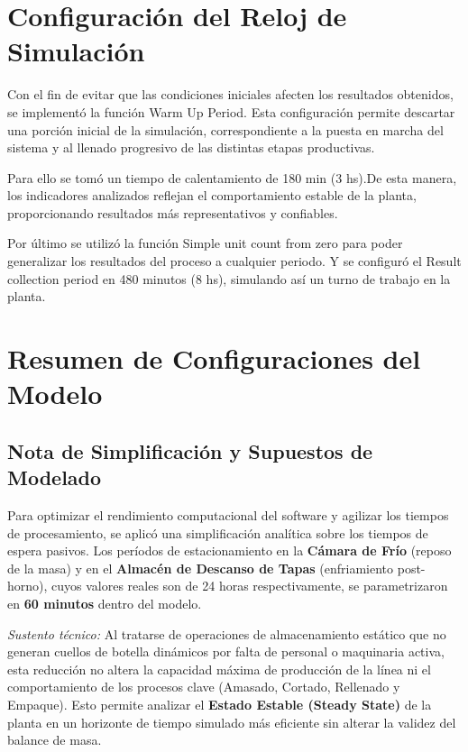 \documentclass[runningheads]{llncs}
\begin{document}
\section{Configuración del Reloj de Simulación}

Con el fin de evitar que las condiciones iniciales afecten los resultados obtenidos, se implementó la función Warm Up Period. Esta configuración permite descartar una porción inicial de la simulación, correspondiente a la puesta en marcha del sistema y al llenado progresivo de las distintas etapas productivas.

Para ello se tomó un tiempo de calentamiento de 180 min (3 hs).De esta manera, los indicadores analizados reflejan el comportamiento estable de la planta, proporcionando resultados más representativos y confiables. 

Por último se utilizó la función Simple unit count from zero para poder generalizar los resultados del proceso a cualquier periodo. Y se configuró el Result collection period en 480 minutos (8 hs), simulando así un turno de trabajo en la planta. 

\section{Resumen de Configuraciones del Modelo}

\subsection{Nota de Simplificación y Supuestos de Modelado}

Para optimizar el rendimiento computacional del software y agilizar los tiempos de procesamiento, se aplicó una simplificación analítica sobre los tiempos de espera pasivos. Los períodos de estacionamiento en la \textbf{Cámara de Frío} (reposo de la masa) y en el \textbf{Almacén de Descanso de Tapas} (enfriamiento post-horno), cuyos valores reales son de 24 horas respectivamente, se parametrizaron en \textbf{60 minutos} dentro del modelo.

\textit{Sustento técnico:} Al tratarse de operaciones de almacenamiento estático que no generan cuellos de botella dinámicos por falta de personal o maquinaria activa, esta reducción no altera la capacidad máxima de producción de la línea ni el comportamiento de los procesos clave (Amasado, Cortado, Rellenado y Empaque). Esto permite analizar el \textbf{Estado Estable (Steady State)} de la planta en un horizonte de tiempo simulado más eficiente sin alterar la validez del balance de masa.
\end{document}
